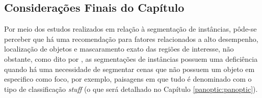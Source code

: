 \subsection{Considerações Finais do Capítulo}
\label{instance:conclusion}

Por meio dos estudos realizados em relação à segmentação de instâncias, pôde-se perceber que há uma recomendação para fatores relacionados a alto desempenho, localização de objetos e mascaramento exato das regiões de interesse, não obstante, como dito por \cite{Kirillov2019a}, as segmentações de instâncias possuem uma deficiência quando há uma necessidade de segmentar cenas que não possuem um objeto em especifico como foco, por exemplo, paisagens em que tudo é denominado com o tipo de classificação \textit{stuff} (o que será detalhado no Capítulo \ref{panoptic:panoptic}).
